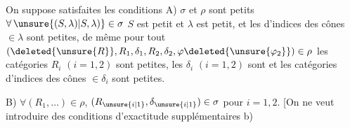 On suppose satisfaites les conditions
A) $\sigma$ et $\rho$ sont petits  $\forall\,\unsure{(S,\lambda)|S,\lambda)}\in\sigma$ $S$ est petit et $\lambda$ est petit, et les   d'indices des cônes $\in\lambda$ sont petites, de même pour tout $(\deleted{\unsure{R}},R_1,\delta_1,R_2,\delta_2,\varphi\deleted{\unsure{\varphi_2}})\in\rho$ les catégories  $R_i$ $(i=1,2)$ sont petites, les $\delta_i$ $(i=1,2)$ sont  et les catégories d'indices des cônes $\in\delta_i$ sont petites.

B) $\forall(R_1,\ldots)\in\rho$, $(R_{\unsure{i|1}},\delta_{\unsure{i|1}})\in\sigma$ pour $i=1,2$.  [On ne veut introduire des conditions d'exactitude supplémentaires b)
